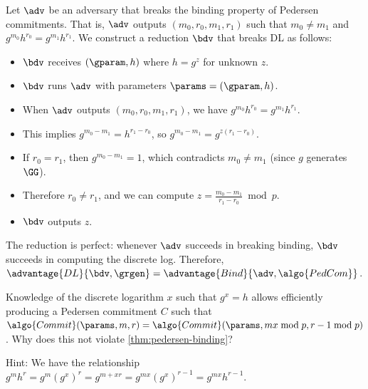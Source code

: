 \ifsolutions
\begin{mysolution}
  Let $\adv$ be an adversary that breaks the binding property of Pedersen commitments.
  That is, $\adv$ outputs $(m_0, r_0, m_1, r_1)$ such that $m_0 \neq m_1$ and $g^{m_0}h^{r_0} = g^{m_1}h^{r_1}$.
  We construct a \ppt reduction $\bdv$ that breaks DL as follows:
  \begin{itemize}
    \item $\bdv$ receives $(\gparam, h)$ where $h = g^z$ for unknown $z$.
    \item $\bdv$ runs $\adv$ with parameters $\params = (\gparam, h)$.
    \item When $\adv$ outputs $(m_0, r_0, m_1, r_1)$, we have $g^{m_0}h^{r_0} = g^{m_1}h^{r_1}$.
    \item This implies $g^{m_0 - m_1} = h^{r_1 - r_0}$, so $g^{m_0 - m_1} = g^{z(r_1 - r_0)}$.
    \item If $r_0 = r_1$, then $g^{m_0 - m_1} = 1$, which contradicts $m_0 \neq m_1$ (since $g$ generates $\GG$).
    \item Therefore $r_0 \neq r_1$, and we can compute $z = \frac{m_0 - m_1}{r_1 - r_0} \bmod p$.
    \item $\bdv$ outputs $z$.
  \end{itemize}
  The reduction is perfect: whenever $\adv$ succeeds in breaking binding, $\bdv$ succeeds in computing the discrete log.
  Therefore, $\advantage{DL}{\bdv, \grgen} = \advantage{Bind}{\adv, \algo{PedCom}}$.
\end{mysolution}
\fi

\begin{exercise}[Optional]
  Knowledge of the discrete logarithm $x$ such that $g^x = h$ allows efficiently producing a Pedersen commitment $C$ such that $\algo{Commit}(\params, m, r) = \algo{Commit}(\params, mx \bmod p, r - 1 \bmod p)$.
  Why does this not violate \autoref{thm:pedersen-binding}?
  
  Hint: We have the relationship $g^m h^r = g^m (g^x)^r = g^{m + xr} = g^{mx} (g^x)^{r-1} = g^{mx} h^{r-1}$.
\end{exercise}

